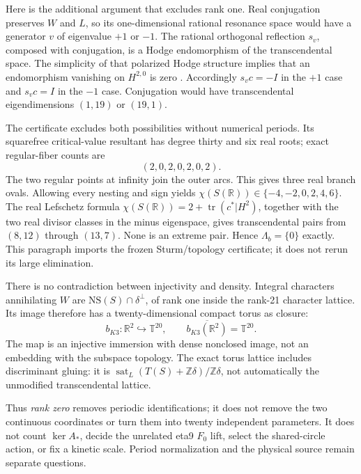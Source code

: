 \documentclass[11pt,a4paper]{article}
\begin{document}
Here is the additional argument that excludes rank one. Real conjugation
preserves \(W\) and \(L\), so its one-dimensional rational resonance space
would have a generator \(v\) of eigenvalue \(+1\) or \(-1\).
The rational orthogonal reflection \(s_v\), composed with conjugation, is a
Hodge endomorphism of the transcendental space. The simplicity of that
polarized Hodge structure implies that an endomorphism vanishing on
\(H^{2,0}\) is zero \cite{HuybrechtsTranscendental}. Accordingly
\(s_vc=-I\) in the \(+1\) case and \(s_vc=I\) in the \(-1\) case.
Conjugation would have transcendental eigendimensions \((1,19)\) or
\((19,1)\).

The certificate excludes both possibilities without numerical periods.
Its squarefree critical-value resultant has degree thirty and six real
roots; exact regular-fiber counts are
\[
 (2,0,2,0,2,0,2).
\]
The two regular points at infinity join the outer arcs. This gives three
real branch ovals. Allowing every nesting and sign yields
\(\chi(S(\mathbb R))\in\{-4,-2,0,2,4,6\}\).
The real Lefschetz formula
\(\chi(S(\mathbb R))=2+\operatorname{tr}(c^*|H^2)\), together with the
two real divisor classes in the minus eigenspace, gives transcendental
pairs from \((8,12)\) through \((13,7)\). None is an extreme pair.
Hence \(\Lambda_b=\{0\}\) exactly. This paragraph imports the frozen
Sturm/topology certificate; it does not rerun its large elimination.

There is no contradiction between injectivity and density. Integral
characters annihilating \(W\) are
\(\mathrm{NS}(S)\cap\delta^\perp\), of rank one inside the rank-21
character lattice. Its image therefore has a twenty-dimensional compact
torus as closure:
\begin{equation}
 b_{K3}:\mathbb R^2\hookrightarrow \mathbb T^{20},
 \qquad \overline{b_{K3}(\mathbb R^2)}=\mathbb T^{20}.
 \tag{Q4}\label{eq:q79-bk3-dense}
\end{equation}
The map is an injective immersion with dense nonclosed image, not an
embedding with the subspace topology. The exact torus lattice includes
discriminant gluing: it is
\(\operatorname{sat}_L(T(S)+\mathbb Z\delta)/\mathbb Z\delta\),
not automatically the unmodified transcendental lattice.

Thus \emph{rank zero} removes periodic identifications; it does not remove
the two continuous coordinates or turn them into twenty independent
parameters. It does not count \(\ker A_*\), decide the unrelated eta9
\(F_0\) lift, select the shared-circle action, or fix a kinetic scale.
Period normalization and the physical source remain separate questions.
\end{document}
